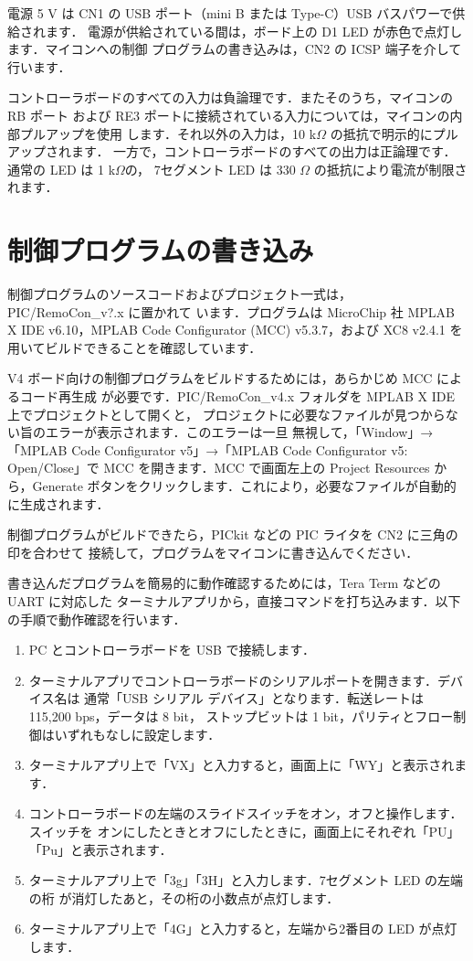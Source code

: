電源 5 V は CN1 の USB ポート（mini B または Type-C）USB バスパワーで供給されます．
電源が供給されている間は，ボード上の D1 LED が赤色で点灯します．マイコンへの制御
プログラムの書き込みは，CN2 の ICSP 端子を介して行います．

コントローラボードのすべての入力は負論理です．またそのうち，マイコンの RB ポート
および RE3 ポートに接続されている入力については，マイコンの内部プルアップを使用
します．それ以外の入力は，10 k$\Omega$ の抵抗で明示的にプルアップされます．
一方で，コントローラボードのすべての出力は正論理です．通常の LED は 1 k$\Omega$の，
7セグメント LED は 330 $\Omega$ の抵抗により電流が制限されます．

\section{制御プログラムの書き込み}

制御プログラムのソースコードおよびプロジェクト一式は，PIC/RemoCon\_v?.x に置かれて
います．プログラムは MicroChip 社 MPLAB X IDE v6.10，MPLAB Code Configurator (MCC)
v5.3.7，および XC8 v2.4.1 を用いてビルドできることを確認しています．

V4 ボード向けの制御プログラムをビルドするためには，あらかじめ MCC によるコード再生成
が必要です．PIC/RemoCon\_v4.x フォルダを MPLAB X IDE 上でプロジェクトとして開くと，
プロジェクトに必要なファイルが見つからない旨のエラーが表示されます．このエラーは一旦
無視して，「Window」→「MPLAB Code Configurator v5」→「MPLAB Code Configurator v5:
Open/Close」で MCC を開きます．MCC で画面左上の Project Resources から，Generate
ボタンをクリックします．これにより，必要なファイルが自動的に生成されます．

制御プログラムがビルドできたら，PICkit などの PIC ライタを CN2 に三角の印を合わせて
接続して，プログラムをマイコンに書き込んでください．

書き込んだプログラムを簡易的に動作確認するためには，Tera Term などの UART に対応した
ターミナルアプリから，直接コマンドを打ち込みます．以下の手順で動作確認を行います．

\begin{enumerate}
 \item PC とコントローラボードを USB で接続します．
 \item ターミナルアプリでコントローラボードのシリアルポートを開きます．デバイス名は
 通常「USB シリアル デバイス」となります．転送レートは 115,200 bps，データは 8 bit，
 ストップビットは 1 bit，パリティとフロー制御はいずれもなしに設定します．
 \item ターミナルアプリ上で「VX」と入力すると，画面上に「WY」と表示されます．
 \item コントローラボードの左端のスライドスイッチをオン，オフと操作します．スイッチを
 オンにしたときとオフにしたときに，画面上にそれぞれ「PU」「Pu」と表示されます．
 \item ターミナルアプリ上で「3g」「3H」と入力します．7セグメント LED の左端の桁
 が消灯したあと，その桁の小数点が点灯します．
 \item ターミナルアプリ上で「4G」と入力すると，左端から2番目の LED が点灯します．
\end{enumerate}

